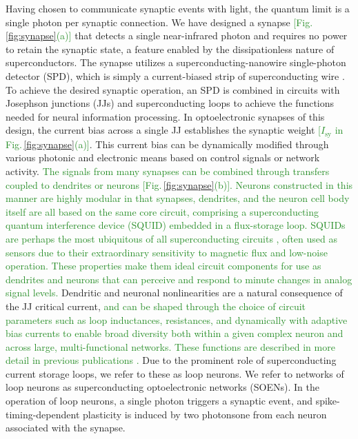 \documentclass{article}
\begin{document}
\begin{multicols}{2}
Having chosen to communicate synaptic events with light, the quantum limit is a single photon per synaptic connection. We have designed a synapse \cite{sh2018,sh2020} \textcolor{ForestGreen}{[Fig.\,\ref{fig:synapse}(a)]} that detects a single near-infrared photon and requires no power to retain the synaptic state, a feature enabled by the dissipationless nature of superconductors. The synapse utilizes a superconducting-nanowire single-photon detector (SPD), which is simply a current-biased strip of superconducting wire \cite{mave2013}. To achieve the desired synaptic operation, an SPD is combined in circuits with Josephson junctions (JJs) and superconducting loops to achieve the functions needed for neural information processing. In optoelectronic synapses of this design, the current bias across a single JJ establishes the synaptic weight \textcolor{ForestGreen}{[$I_{\mathrm{sy}}$ in Fig.\,\ref{fig:synapse}(a)]}. This current bias can be dynamically modified through various photonic and electronic means based on control signals or network activity. \textcolor{ForestGreen}{The signals from many synapses can be combined through transfers coupled to dendrites or neurons [Fig.\,\ref{fig:synapse}(b)]. Neurons constructed in this manner are highly modular in that synapses, dendrites, and the neuron cell body itself are all based on the same core circuit, comprising a superconducting quantum interference device (SQUID) embedded in a flux-storage loop. SQUIDs are perhaps the most ubiquitous of all superconducting circuits \cite{vatu1998,ka1999}, often used as sensors due to their extraordinary sensitivity to magnetic flux and low-noise operation. These properties make them ideal circuit components for use as dendrites and neurons that can perceive and respond to minute changes in analog signal levels.} Dendritic and neuronal nonlinearities are a natural consequence of the JJ critical current, \textcolor{ForestGreen}{and can be shaped through the choice of circuit parameters such as loop inductances, resistances, and dynamically with adaptive bias currents to enable broad diversity both within a given complex neuron and across large, multi-functional networks. These functions are described in more detail in previous publications \cite{sh2018,sh2019,sh2020}.} Due to the prominent role of superconducting current storage loops, we refer to these as loop neurons. We refer to networks of loop neurons as superconducting optoelectronic networks (SOENs). In the operation of loop neurons, a single photon triggers a synaptic event, and spike-timing-dependent plasticity is induced by two photons\textemdash one from each neuron associated with the synapse.


\end{multicols}
\end{document}
